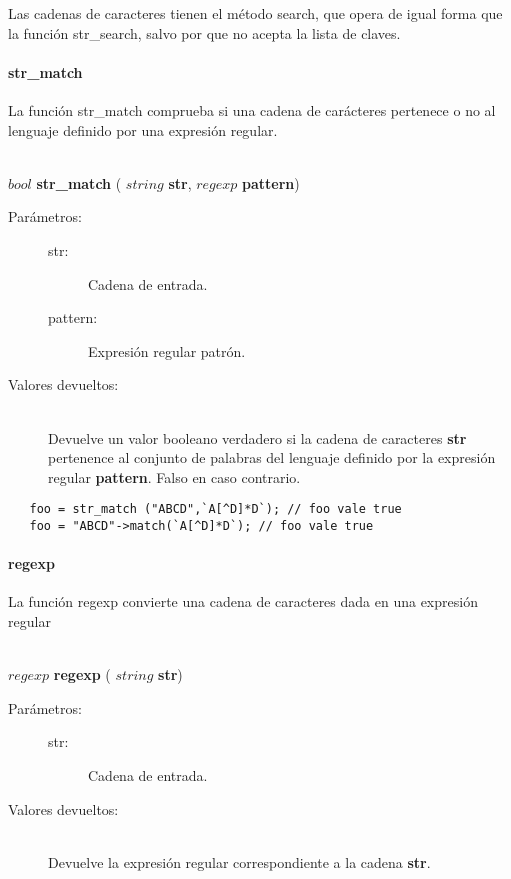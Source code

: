 Las cadenas de caracteres tienen el método search, que opera de igual forma que la
función str\_search, salvo por que no acepta la lista de claves.

\paragraph{str\_match}
La función str\_match comprueba si una cadena de carácteres pertenece o no al
lenguaje definido por una expresión regular.

\begin{framed}
\hfill \\ $bool$ \textbf{str\_match} ( $string$ \textbf{str}, $regexp$ \textbf{pattern})  
\begin{description}
\item [Parámetros:] \hfill 
   \begin{description}
   \item[str:] Cadena de entrada.
   \item[pattern:] Expresión regular patrón. 
   \end{description}
\item[Valores devueltos:] \hfill \\
   Devuelve un valor booleano verdadero si la cadena de caracteres \textbf{str} pertenence
   al conjunto de palabras del lenguaje definido por la expresión regular \textbf{pattern}. Falso
   en caso contrario.
\end{description}
\end{framed}

\begin{lstlisting}   
   foo = str_match ("ABCD",`A[^D]*D`); // foo vale true
   foo = "ABCD"->match(`A[^D]*D`); // foo vale true
\end{lstlisting}


\paragraph{regexp}
La función regexp convierte una cadena de caracteres dada en una expresión regular

\begin{framed}
\hfill \\ $regexp$ \textbf{regexp} ( $string$ \textbf{str})  
\begin{description}
\item [Parámetros:] \hfill 
   \begin{description}
   \item[str:] Cadena de entrada.
   \end{description}
\item[Valores devueltos:] \hfill \\
   Devuelve la expresión regular correspondiente a la cadena \textbf{str}.
\end{description}
\end{framed}

